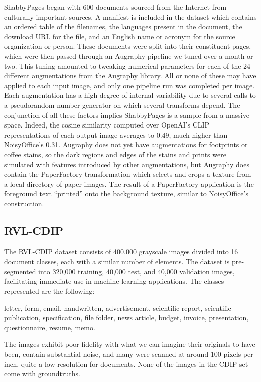 \documentclass[runningheads]{llncs}
\begin{document}
ShabbyPages began with 600 documents sourced from the Internet from culturally-important sources. A manifest is included in the dataset which contains an ordered table of the filenames, the languages present in the document, the download URL for the file, and an English name or acronym for the source organization or person. These documents were split into their constituent pages, which were then passed through an Augraphy pipeline we tuned over a month or two. This tuning amounted to tweaking numerical parameters for each of the 24 different augmentations from the Augraphy library. All or none of these may have applied to each input image, and only one pipeline run was completed per image. Each augmentation has a high degree of internal variability due to several calls to a pseudorandom number generator on which several transforms depend. The conjunction of all these factors implies ShabbyPages is a sample from a massive space. Indeed, the cosine similarity computed over OpenAI's CLIP representations of each output image averages to 0.49, much higher than NoisyOffice's 0.31. Augraphy does not yet have augmentations for footprints or coffee stains, so the dark regions and edges of the stains and prints were simulated with features introduced by other augmentations, but Augraphy does contain the PaperFactory transformation which selects and crops a texture from a local directory of paper images. The result of a PaperFactory application is the foreground text ``printed'' onto the background texture, similar to NoisyOffice's construction.

\subsection{RVL-CDIP}
The RVL-CDIP dataset \cite{ref_RVL-CDIP} consists of 400,000 grayscale images divided into 16 document classes, each with a similar number of elements. The dataset is pre-segmented into 320,000 training, 40,000 test, and 40,000 validation images, facilitating immediate use in machine learning applications. The classes represented are the following:

\begin{center}
letter, form, email, handwritten, advertisement, scientific report,
scientific publication, specification, file folder, news article,
budget, invoice, presentation, questionnaire, resume, memo.
\end{center}

The images exhibit poor fidelity with what we can imagine their originals to have been, contain substantial noise, and many were scanned at around 100 pixels per inch, quite a low resolution for documents. None of the images in the CDIP set come with groundtruths.\\
\end{document}
